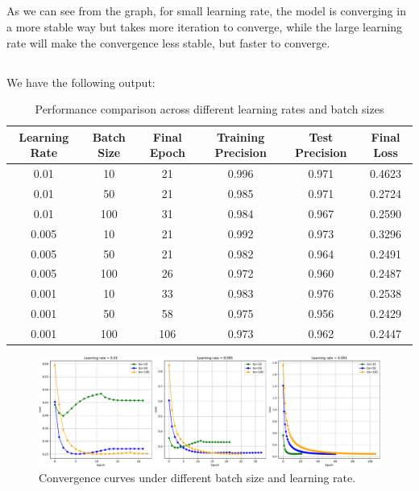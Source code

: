 \documentclass{article}
\begin{document}
\subsection{}
As we can see from the graph, for small learning rate, the model is converging in a more stable way but takes more iteration to converge, while the large learning rate will make the convergence less stable, but faster to converge. 
\clearpage
\subsection{}
We have the following output:\\
\begin{table}[ht]
\centering
\begin{tabular}{|c|c|c|c|c|c|}
\hline
\textbf{Learning Rate} & \textbf{Batch Size} & \textbf{Final Epoch} & \textbf{Training Precision} & \textbf{Test Precision} & \textbf{Final Loss} \\
\hline
0.01 & 10  & 21  & 0.996 & 0.971 & 0.4623 \\
0.01 & 50  & 21  & 0.985 & 0.971 & 0.2724 \\
0.01 & 100 & 31  & 0.984 & 0.967 & 0.2590 \\
\hline
0.005 & 10  & 21  & 0.992 & 0.973 & 0.3296 \\
0.005 & 50  & 21  & 0.982 & 0.964 & 0.2491 \\
0.005 & 100 & 26  & 0.972 & 0.960 & 0.2487 \\
\hline
0.001 & 10  & 33  & 0.983 & 0.976 & 0.2538 \\
0.001 & 50  & 58  & 0.975 & 0.956 & 0.2429 \\
0.001 & 100 & 106 & 0.973 & 0.962 & 0.2447 \\
\hline
\end{tabular}
\caption{Performance comparison across different learning rates and batch sizes}
\label{tab:lr_batch_full}
\end{table}
\begin{figure}[htpb]
    \begin{center}
        \includegraphics[width=1\textwidth]{./figures/logistic_regression_loss_sgd_subplots.pdf}
    \end{center}
    \caption{Convergence curves under different batch size and learning rate.}\label{fig:}
\end{figure}\\
\end{document}
